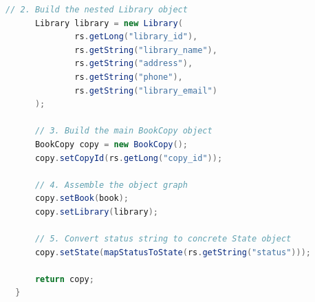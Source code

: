 \documentclass[
  italian,
  paper=a4,
  ,captions=tableheading
]{scrbook}
\begin{document}
\begin{itemize}
\begin{lstlisting}[language=Java, language=Java, caption={Metodo per ricreare un oggetto di tipo BookCopy da una riga del database.}, label={lst:bookcopiesdao}, label=lst:bookcopiesdao]
      // 2. Build the nested Library object
      Library library = new Library(
              rs.getLong("library_id"),
              rs.getString("library_name"),
              rs.getString("address"),
              rs.getString("phone"),
              rs.getString("library_email")
      );

      // 3. Build the main BookCopy object
      BookCopy copy = new BookCopy();
      copy.setCopyId(rs.getLong("copy_id"));

      // 4. Assemble the object graph
      copy.setBook(book);
      copy.setLibrary(library);

      // 5. Convert status string to concrete State object
      copy.setState(mapStatusToState(rs.getString("status")));

      return copy;
  }
\end{lstlisting}
\end{itemize}
\end{document}
